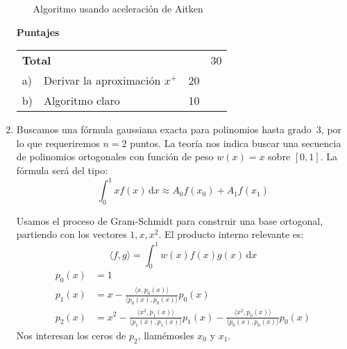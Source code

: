 \documentclass[english, spanish, fleqn]{article}
\begin{document}
\begin{enumerate}
\begin{enumerate}
\begin{algorithm}
	\caption{Algoritmo usando aceleración de Aitken}
	\label{alg:20182c1p1b}
      \end{algorithm}
    \end{enumerate}

    \vspace*{2\baselineskip}
    \begin{minipage}{1.0\linewidth}
      {\Large\textbf{Puntajes}}\\[0.5\baselineskip]
      \begin{tabular}{l@{\;}lrr}
	\multicolumn{2}{l}{\textbf{Total}}		 &    & 30 \\
	a) & Derivar la aproximación \(x^+\)		 & 20 &	   \\
	b) & Algoritmo claro				 & 10 &
      \end{tabular}
    \end{minipage}
\pagebreak[4]
  \item %
    Buscamos una fórmula gaussiana exacta para polinomios hasta grado~\(3\),
    por lo que requeriremos \(n = 2\) puntos.
    La teoría nos indica buscar una secuencia de polinomios ortogonales
    con función de peso \(w(x) = x\) sobre \([0, 1]\).
    La fórmula será del tipo:
    \begin{equation*}
      \int_0^1 x f(x) \, \mathrm{d} x
	\approx A_0 f(x_0) + A_1 f(x_1)
    \end{equation*}

    Usamos el proceso de Gram-Schmidt para construir una base ortogonal,
    partiendo con los vectores \(1, x, x^2\).
    El producto interno relevante es:
    \begin{equation*}
      \langle f, g \rangle
	= \int_0^1 w(x) f(x) g(x) \, \mathrm{d} x
    \end{equation*}
    \begin{align*}
      p_0(x)
	&= 1 \\
      p_1(x)
	&= x - \frac{\langle x, p_0(x) \rangle}
		    {\langle p_0(x), p_0(x) \rangle} p_0(x) \\
      p_2(x)
	&= x^2 - \frac{\langle x^2, p_1(x) \rangle}
		      {\langle p_1(x), p_1(x) \rangle} p_1(x)
	       - \frac{\langle x^2, p_0(x) \rangle}
		      {\langle p_0(x), p_0(x) \rangle} p_0(x)
    \end{align*}
    Nos interesan los ceros de \(p_2\),
    llamémosles \(x_0\) y \(x_1\).


\end{enumerate}
\end{document}
